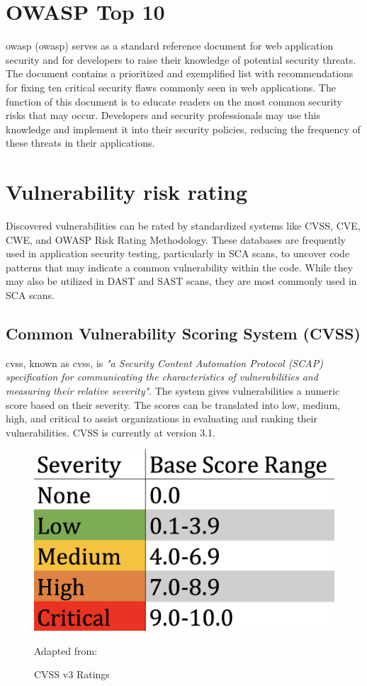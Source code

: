 \section{OWASP Top 10}
\acrlong{owasp} (\acrshort{owasp}) serves as a standard reference document for web application security and for developers to raise their knowledge of potential security threats. The document contains a prioritized and exemplified list with recommendations for fixing ten critical security flaws commonly seen in web applications. The function of this document is to educate readers on the most common security risks that may occur. Developers and security professionals may use this knowledge and implement it into their security policies, reducing the frequency of these threats in their applications. 


\section{Vulnerability risk rating}
Discovered vulnerabilities can be rated by standardized systems like CVSS, CVE, CWE, and OWASP Risk Rating Methodology. These databases are frequently used in application security testing, particularly in SCA scans, to uncover code patterns that may indicate a common vulnerability within the code. While they may also be utilized in DAST and SAST scans, they are most commonly used in SCA scans. 

\subsection{Common Vulnerability Scoring System (CVSS)}
\acrlong{cvss}, known as \acrshort{cvss}, is \textit{"a Security Content Automation Protocol (SCAP) specification for communicating the characteristics of vulnerabilities and measuring their relative severity"}\cite{nistCVSS}. The system gives vulnerabilities a numeric score based on their severity. The scores can be translated into low, medium, high, and critical to assist organizations in evaluating and ranking their vulnerabilities. CVSS is currently at version 3.1. \cite{CVSS}

\begin{figure}[H]
    \centering
    \includegraphics[scale=0.3]{Images/CVSS.png}
    \caption{CVSS v3 Ratings} Adapted from:\cite{cvssrating}
    \label{fig:CVSS v3 Ratings}
\end{figure}

